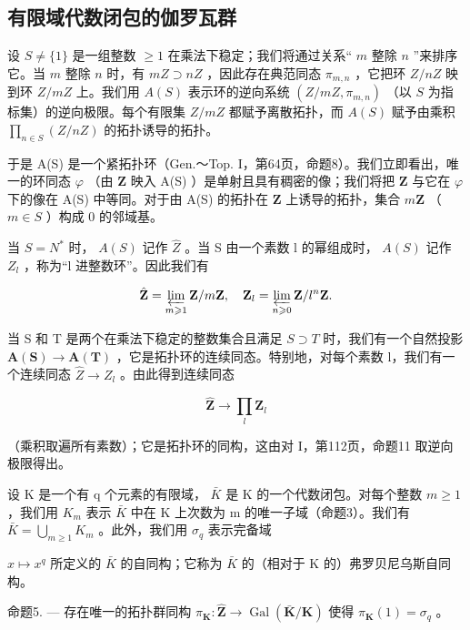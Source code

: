 \subsection{有限域代数闭包的伽罗瓦群}

设 \(S \neq \{1\}\) 是一组整数 \(\geqslant 1\) 在乘法下稳定；我们将通过关系“ \(m\) 整除 \(n\) ”来排序它。当 \(m\) 整除 \(n\) 时，有 \(mZ \supset nZ\) ，因此存在典范同态 \(\pi_{m,n}\) ，它把环 \(Z/nZ\) 映到环 \(Z/mZ\) 上。我们用 \(A(S)\) 表示环的逆向系统 \((Z/mZ, \pi_{m,n})\) （以 \(S\) 为指标集）的逆向极限。每个有限集 \(Z/mZ\) 都赋予离散拓扑，而 \(A(S)\) 赋予由乘积 \(\prod_{n \in S} (Z/nZ)\) 的拓扑诱导的拓扑。

于是 A(S) 是一个紧拓扑环（Gen.～Top. I，第64页，命题8）。我们立即看出，唯一的环同态 \(\varphi\) （由 \(\mathbf{Z}\) 映入 A(S) ）是单射且具有稠密的像；我们将把 \(\mathbf{Z}\) 与它在 \(\varphi\) 下的像在 A(S) 中等同。对于由 A(S) 的拓扑在 \(\mathbf{Z}\) 上诱导的拓扑，集合 \(m\mathbf{Z}\) （ \(m \in S\) ）构成 0 的邻域基。

当 \(S = N^{*}\) 时， \(A(S)\) 记作 \(\hat{Z}\) 。当 S 由一个素数 l 的幂组成时， \(A(S)\) 记作 \(Z_{l}\) ，称为“l 进整数环”。因此我们有

\[
\hat {\mathbf {Z}} = \varprojlim_ {m \geqslant 1} \mathbf {Z} / m \mathbf {Z}, \quad \mathbf {Z} _ {l} = \varprojlim_ {n \geqslant 0} \mathbf {Z} / l ^ {n} \mathbf {Z}.
\]

当 S 和 T 是两个在乘法下稳定的整数集合且满足 \(S \supset T\) 时，我们有一个自然投影 \(\mathbf{A}(\mathbf{S}) \to \mathbf{A}(\mathbf{T})\) ，它是拓扑环的连续同态。特别地，对每个素数 l，我们有一个连续同态 \(\hat{Z} \to Z_{l}\) 。由此得到连续同态

\[
\hat {\mathbf {Z}} \rightarrow \prod_ {l} \mathbf {Z} _ {l}
\]

（乘积取遍所有素数）；它是拓扑环的同构，这由对 I，第112页，命题11 取逆向极限得出。

设 K 是一个有 q 个元素的有限域， \(\bar{K}\) 是 K 的一个代数闭包。对每个整数 \(m \geqslant 1\) ，我们用 \(K_{m}\) 表示 \(\bar{K}\) 中在 K 上次数为 m 的唯一子域（命题3）。我们有 \(\bar{K} = \bigcup_{m \geqslant 1} K_{m}\) 。此外，我们用 \(\sigma_{q}\) 表示完备域

\(x \mapsto x^{q}\) 所定义的 \(\bar{K}\) 的自同构；它称为 \(\bar{K}\) 的（相对于 K 的）弗罗贝尼乌斯自同构。

命题5. --- 存在唯一的拓扑群同构 \(\pi_{\mathbf{K}}: \hat{\mathbf{Z}} \to \operatorname{Gal}(\bar{\mathbf{K}} / \mathbf{K})\) 使得 \(\pi_{\mathbf{K}}(1) = \sigma_q\) 。

